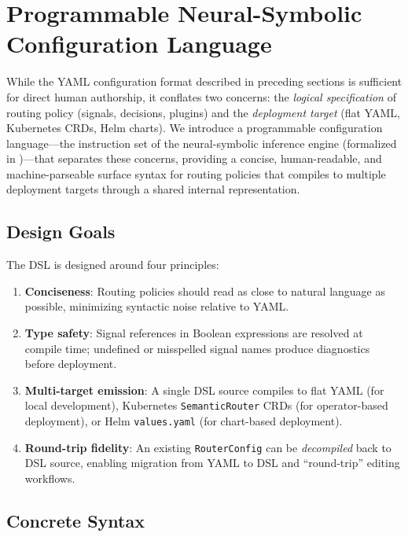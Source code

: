 
\section{Programmable Neural-Symbolic Configuration Language}
\label{sec:dsl}

While the YAML configuration format described in preceding sections is sufficient for direct human authorship, it conflates two concerns: the \emph{logical specification} of routing policy (signals, decisions, plugins) and the \emph{deployment target} (flat YAML, Kubernetes CRDs, Helm charts).
We introduce a programmable configuration language---the instruction set of the neural-symbolic inference engine (formalized in )---that separates these concerns, providing a concise, human-readable, and machine-parseable surface syntax for routing policies that compiles to multiple deployment targets through a shared internal representation.

\subsection{Design Goals}

The DSL is designed around four principles:

\begin{enumerate}
  \item \textbf{Conciseness}: Routing policies should read as close to natural language as possible, minimizing syntactic noise relative to YAML.
  \item \textbf{Type safety}: Signal references in Boolean expressions are resolved at compile time; undefined or misspelled signal names produce diagnostics before deployment.
  \item \textbf{Multi-target emission}: A single DSL source compiles to flat YAML (for local development), Kubernetes \texttt{SemanticRouter} CRDs (for operator-based deployment), or Helm \texttt{values.yaml} (for chart-based deployment).
  \item \textbf{Round-trip fidelity}: An existing \texttt{RouterConfig} can be \emph{decompiled} back to DSL source, enabling migration from YAML to DSL and ``round-trip'' editing workflows.
\end{enumerate}

\subsection{Concrete Syntax}
\label{sec:dsl_syntax}

